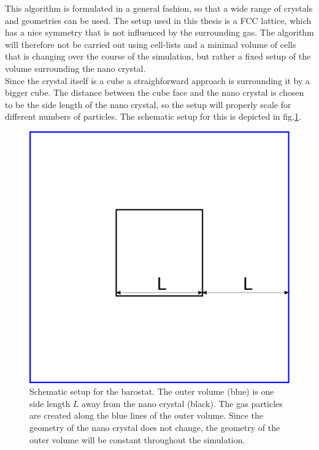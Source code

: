 \documentclass[12pt]{article}
\begin{document}
This algorithm is formulated in a general fashion, so that a wide range of crystals and geometries can be used. The setup used in this thesis is a
FCC lattice, which has a nice symmetry that is not influenced by the surrounding gas. The algorithm will therefore not be carried out using 
cell-lists and a minimal volume of cells that is changing over the course of the simulation, but rather a fixed setup of the volume surrounding the 
nano crystal.\\ 
Since the crystal itself is a cube a straighforward approach is surrounding it by a bigger cube. The distance between the cube face and the nano
crystal is chosen to be the side length of the nano crystal, so the setup will properly scale for different numbers of particles. 
The schematic setup for this is depicted in fig.\ref{fig:gascube}.
\begin{figure}[h]
    \begin{center}
        \includegraphics[scale=0.5]{images/gas_volume_ver2.pdf}
        \caption{Schematic setup for the barostat. The outer volume (blue) is one side length $L$ away from the nano crystal (black). 
                    The gas particles are created along the blue lines of the outer volume. Since the geometry of the nano crystal does not change, 
                    the geometry of the outer volume will be constant throughout the simulation.}
        \label{fig:gascube}
    \end{center}
\end{figure}
\end{document}
